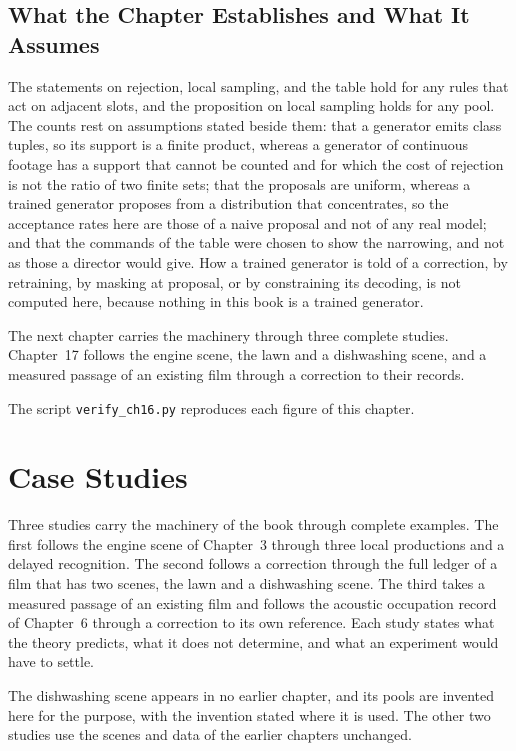 \documentclass[11pt,twoside,openright]{book}
\theoremstyle{plain}
\theoremstyle{definition}
\theoremstyle{remark}
\begin{document}
\section{What the Chapter Establishes and What It Assumes}\label{sec:limits16}

The statements on rejection, local sampling, and the table hold for any rules that act on adjacent slots, and the proposition on local sampling holds for any pool. The counts rest on assumptions stated beside them: that a generator emits class tuples, so its support is a finite product, whereas a generator of continuous footage has a support that cannot be counted and for which the cost of rejection is not the ratio of two finite sets; that the proposals are uniform, whereas a trained generator proposes from a distribution that concentrates, so the acceptance rates here are those of a naive proposal and not of any real model; and that the commands of the table were chosen to show the narrowing, and not as those a director would give. How a trained generator is told of a correction, by retraining, by masking at proposal, or by constraining its decoding, is not computed here, because nothing in this book is a trained generator.

The next chapter carries the machinery through three complete studies. Chapter~17 follows the engine scene, the lawn and a dishwashing scene, and a measured passage of an existing film through a correction to their records.

The script \texttt{verify\_ch16.py} reproduces each figure of this chapter.

\chapter{Case Studies}
\label{ch:cases}

Three studies carry the machinery of the book through complete examples. The first follows the engine scene of Chapter~3 through three local productions and a delayed recognition. The second follows a correction through the full ledger of a film that has two scenes, the lawn and a dishwashing scene. The third takes a measured passage of an existing film and follows the acoustic occupation record of Chapter~6 through a correction to its own reference. Each study states what the theory predicts, what it does not determine, and what an experiment would have to settle.

The dishwashing scene appears in no earlier chapter, and its pools are invented here for the purpose, with the invention stated where it is used. The other two studies use the scenes and data of the earlier chapters unchanged.
\end{document}
